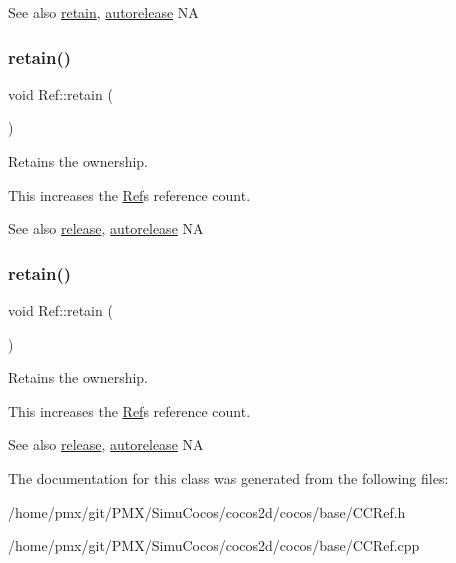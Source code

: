 \begin{DoxySeeAlso}{See also}
\hyperlink{classRef_a7d182cae1be1e80a9884cacd6ff9cb01}{retain}, \hyperlink{classRef_a065f6972ebb82de3e2143cbf10a7ac2d}{autorelease}  NA 
\end{DoxySeeAlso}
\mbox{\label{classRef_a7d182cae1be1e80a9884cacd6ff9cb01}} 
\subsubsection{\texorpdfstring{retain()}{retain()}\hspace{0.1cm}{\footnotesize\ttfamily [1/2]}}
{\footnotesize\ttfamily void Ref\+::retain (\begin{DoxyParamCaption}{ }\end{DoxyParamCaption})}

Retains the ownership.

This increases the \hyperlink{classRef}{Ref}\textquotesingle{}s reference count.

\begin{DoxySeeAlso}{See also}
\hyperlink{classRef_a6c8528cd8731765688943496c2eb3907}{release}, \hyperlink{classRef_a065f6972ebb82de3e2143cbf10a7ac2d}{autorelease}  NA 
\end{DoxySeeAlso}
\mbox{\label{classRef_a7d182cae1be1e80a9884cacd6ff9cb01}} 
\subsubsection{\texorpdfstring{retain()}{retain()}\hspace{0.1cm}{\footnotesize\ttfamily [2/2]}}
{\footnotesize\ttfamily void Ref\+::retain (\begin{DoxyParamCaption}{ }\end{DoxyParamCaption})}

Retains the ownership.

This increases the \hyperlink{classRef}{Ref}\textquotesingle{}s reference count.

\begin{DoxySeeAlso}{See also}
\hyperlink{classRef_a6c8528cd8731765688943496c2eb3907}{release}, \hyperlink{classRef_a065f6972ebb82de3e2143cbf10a7ac2d}{autorelease}  NA 
\end{DoxySeeAlso}


The documentation for this class was generated from the following files\+:\begin{DoxyCompactItemize}
\item 
/home/pmx/git/\+P\+M\+X/\+Simu\+Cocos/cocos2d/cocos/base/C\+C\+Ref.\+h\item 
/home/pmx/git/\+P\+M\+X/\+Simu\+Cocos/cocos2d/cocos/base/C\+C\+Ref.\+cpp\end{DoxyCompactItemize}

